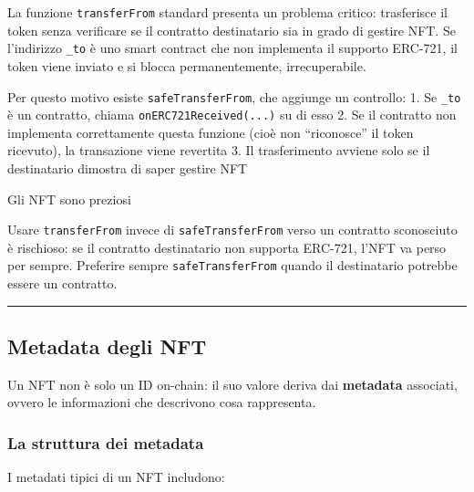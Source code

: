 \documentclass[
  italian,
  openany]{book}
\begin{document}
La funzione \texttt{transferFrom} standard presenta un problema critico:
trasferisce il token senza verificare se il contratto destinatario sia
in grado di gestire NFT. Se l'indirizzo \texttt{\_to} è uno smart
contract che non implementa il supporto ERC-721, il token viene inviato
e si blocca permanentemente, irrecuperabile.

Per questo motivo esiste \texttt{safeTransferFrom}, che aggiunge un
controllo: 1. Se \texttt{\_to} è un contratto, chiama
\texttt{onERC721Received(...)} su di esso 2. Se il contratto non
implementa correttamente questa funzione (cioè non ``riconosce'' il
token ricevuto), la transazione viene revertita 3. Il trasferimento
avviene solo se il destinatario dimostra di saper gestire NFT

\begin{calloutwarning}{Gli NFT sono preziosi}

Usare \texttt{transferFrom} invece di \texttt{safeTransferFrom} verso un
contratto sconosciuto è rischioso: se il contratto destinatario non
supporta ERC-721, l'NFT va perso per sempre. Preferire sempre
\texttt{safeTransferFrom} quando il destinatario potrebbe essere un
contratto.

\end{calloutwarning}

\begin{center}\rule{0.5\linewidth}{0.5pt}\end{center}

\subsection{Metadata degli NFT}\label{metadata-degli-nft}

Un NFT non è solo un ID on-chain: il suo valore deriva dai
\textbf{metadata} associati, ovvero le informazioni che descrivono cosa
rappresenta.

\subsubsection{La struttura dei
metadata}\label{la-struttura-dei-metadata}

I metadati tipici di un NFT includono:
\end{document}
